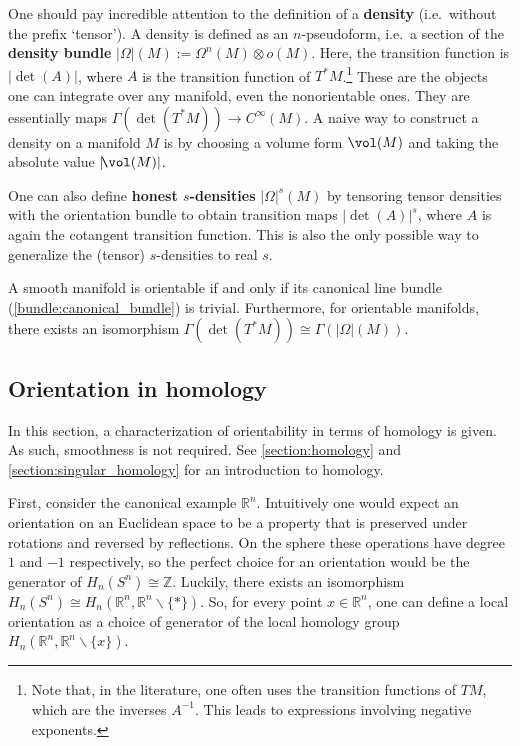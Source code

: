     \begin{remark}\label{bundle:honest_density}
        One should pay incredible attention to the definition of a \textbf{density} (i.e.~without the prefix `tensor'). A density is defined as an $n$-pseudoform, i.e.~a section of the \textbf{density bundle} $|\Omega|(M):=\Omega^n(M)\otimes o(M)$. Here, the transition function is $|\!\det(A)|$, where $A$ is the transition function of $T^*M$.\footnote{Note that, in the literature, one often uses the transition functions of $TM$, which are the inverses $A^{-1}$. This leads to expressions involving negative exponents.} These are the objects one can integrate over any manifold, even the nonorientable ones. They are essentially maps $\Gamma(\det(T^*M))\rightarrow C^\infty(M)$. A naive way to construct a density on a manifold $M$ is by choosing a volume form $\vol(M)$ and taking the absolute value $|\!\vol(M)|$.

        One can also define \textbf{honest $s$-densities} $|\Omega|^s(M)$ by tensoring tensor densities with the orientation bundle to obtain transition maps $|\!\det(A)|^s$, where $A$ is again the cotangent transition function. This is also the only possible way to generalize the (tensor) $s$-densities to real $s$.
    \end{remark}

    \begin{property}[Orientability]
        A smooth manifold is orientable if and only if its canonical line bundle (\cref{bundle:canonical_bundle}) is trivial. Furthermore, for orientable manifolds, there exists an isomorphism $\Gamma(\det(T^*M))\cong\Gamma(|\Omega|(M))$.
    \end{property}

\subsection{Orientation in homology}

    In this section, a characterization of orientability in terms of homology is given. As such, smoothness is not required. See \cref{section:homology} and \cref{section:singular_homology} for an introduction to homology.

    First, consider the canonical example $\mathbb{R}^n$. Intuitively one would expect an orientation on an Euclidean space to be a property that is preserved under rotations and reversed by reflections. On the sphere these operations have degree $1$ and $-1$ respectively, so the perfect choice for an orientation would be the generator of $H_n(S^n)\cong\mathbb{Z}$. Luckily, there exists an isomorphism $H_n(S^n)\cong H_n(\mathbb{R}^n,\mathbb{R}^n\backslash\{\ast\})$. So, for every point $x\in\mathbb{R}^n$, one can define a local orientation as a choice of generator of the local homology group $H_n(\mathbb{R}^n,\mathbb{R}^n\backslash\{x\})$.

